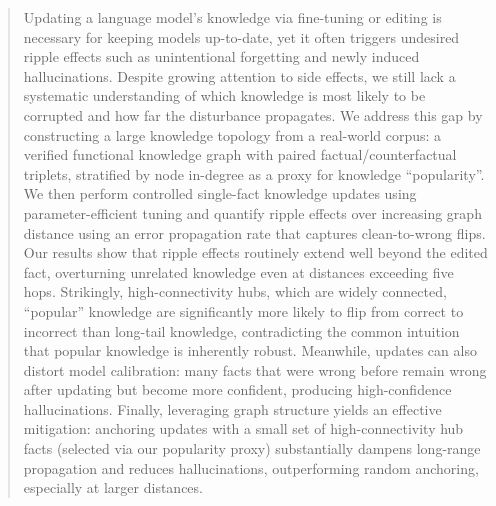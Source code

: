 \begin{abstract}
Updating a language model’s knowledge via fine-tuning or editing is necessary for keeping models up-to-date, yet it often triggers undesired ripple effects such as unintentional forgetting and newly induced hallucinations. Despite growing attention to side effects, we still lack a systematic understanding of which knowledge is most likely to be corrupted and how far the disturbance propagates. We address this gap by constructing a large knowledge topology from a real-world corpus: a verified functional knowledge graph with paired factual/counterfactual triplets, stratified by node in-degree as a proxy for knowledge ``popularity''. We then perform controlled single-fact knowledge updates using parameter-efficient tuning and quantify ripple effects over increasing graph distance using an error propagation rate that captures clean-to-wrong flips.
Our results show that ripple effects routinely extend well beyond the edited fact, overturning unrelated knowledge even at distances exceeding five hops. Strikingly, high-connectivity hubs, which are widely connected, “popular” knowledge are significantly more likely to flip from correct to incorrect than long-tail knowledge, contradicting the common intuition that popular knowledge is inherently robust. Meanwhile, updates can also distort model calibration: many facts that were wrong before remain wrong after updating but become more confident, producing high-confidence hallucinations. Finally, leveraging graph structure yields an effective mitigation: anchoring updates with a small set of high-connectivity hub facts (selected via our popularity proxy) substantially dampens long-range propagation and reduces hallucinations, outperforming random anchoring, especially at larger distances.


\end{abstract}
